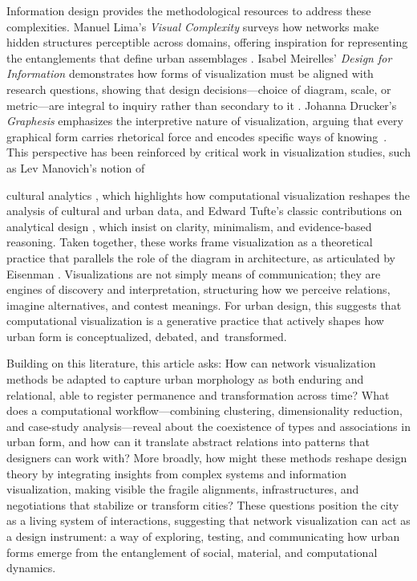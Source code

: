 \documentclass[land,article,accept,pdftex,oneauthor]{Definitions/mdpi}
\begin{document}
Information design provides the methodological resources to address these complexities. Manuel Lima’s \textit{Visual Complexity} surveys how networks make hidden structures perceptible across domains, offering inspiration for representing the entanglements that define urban assemblages \cite{lima_visual_2011}. Isabel Meirelles’ \textit{Design for Information} demonstrates how forms of visualization must be aligned with research questions, showing that design \mbox{decisions---choice} of diagram, scale, or metric---are integral to inquiry rather than secondary to it \cite{meirelles_design_2013}. Johanna Drucker’s \textit{Graphesis} emphasizes the interpretive nature of visualization, arguing that every graphical form carries rhetorical force and encodes specific ways of knowing~\cite{drucker_graphesis_2014}. This perspective has been reinforced by critical work in visualization studies, such as Lev Manovich’s notion of {cultural analytics \cite{manovich_cultural_2020}, which highlights how computational visualization reshapes the analysis of cultural and urban data, and Edward Tufte’s classic contributions on analytical design \cite{tufte_visual_2001}, which insist on clarity, minimalism, and evidence-based reasoning. Taken together, these works frame visualization as a theoretical practice that parallels the role of the diagram in architecture, as articulated by Eisenman \cite{eisenman_peter_1999}. Visualizations are not simply means of communication; they are engines of discovery and interpretation, structuring how we perceive relations, imagine alternatives, and contest meanings. For urban design, this suggests that computational visualization is a generative practice that actively shapes how urban form is conceptualized, debated, and~\mbox{transformed}.


Building on this literature, this article asks: How can network visualization methods be adapted to capture urban morphology as both enduring and relational, able to register permanence and transformation across time? What does a computational \mbox{workflow---combining} clustering, dimensionality reduction, and case-study \mbox{analysis---reveal} about the coexistence of types and associations in urban form, and how can it translate abstract relations into patterns that designers can work with? More broadly, how might these methods reshape design theory by integrating insights from complex systems and information visualization, making visible the fragile alignments, infrastructures, and negotiations that stabilize or transform cities? These questions position the city as a living system of interactions, suggesting that network visualization can act as a design instrument: a way of exploring, testing, and communicating how urban forms emerge from the entanglement of social, material, and computational dynamics.


}
\end{document}
